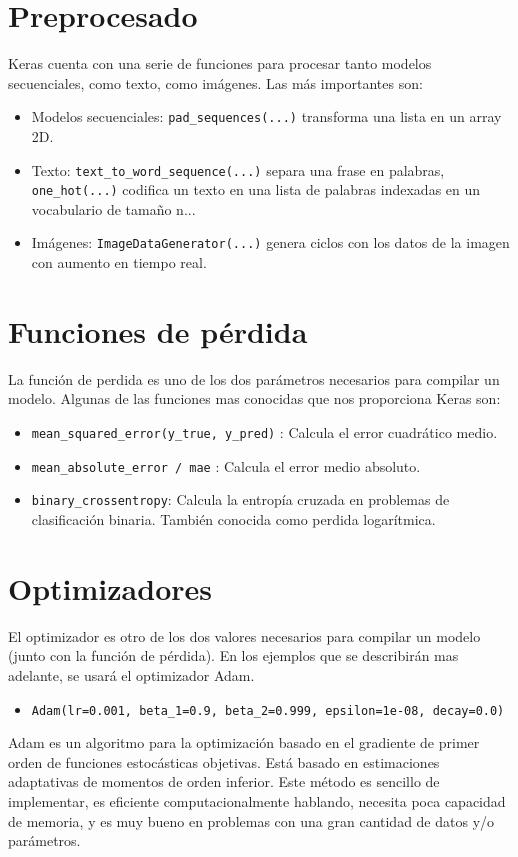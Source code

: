 \section{Preprocesado}
Keras cuenta con una serie de funciones para procesar tanto modelos secuenciales, como texto, como imágenes. Las más importantes son:
\begin{itemize}
\item Modelos secuenciales: \lstinline{pad_sequences(...)} transforma una lista en un array 2D.
\item Texto: \lstinline{text_to_word_sequence(...)} separa una frase en palabras, \lstinline{one_hot(...)} codifica un texto en una lista de palabras indexadas en un vocabulario de tamaño n...
\item Imágenes: \lstinline{ImageDataGenerator(...)} genera ciclos con los datos de la imagen con aumento en tiempo real.
\end{itemize}
\section{Funciones de pérdida}
La función de perdida es uno de los dos parámetros necesarios para compilar un modelo. Algunas de las funciones mas conocidas que nos proporciona Keras son:
\begin{itemize}[noitemsep]
\item \lstinline{mean_squared_error(y_true, y_pred)} : Calcula el error cuadrático medio.
\item \lstinline{mean_absolute_error / mae} : Calcula el error medio absoluto.
\item \lstinline{binary_crossentropy}: Calcula la entropía cruzada en problemas de clasificación binaria. También conocida como perdida logarítmica.
\end{itemize}
\section{Optimizadores}
El optimizador es otro de los dos valores necesarios para compilar un modelo (junto con la función de pérdida). En los ejemplos que se describirán mas adelante, se usará el optimizador Adam.
\begin{itemize}
\item \lstinline{Adam(lr=0.001, beta_1=0.9, beta_2=0.999, epsilon=1e-08, decay=0.0)}
\end{itemize}
Adam es un algoritmo para la optimización basado en el gradiente de primer orden de funciones estocásticas objetivas. Está basado en estimaciones adaptativas de momentos de orden inferior. Este método es sencillo de implementar, es eficiente computacionalmente hablando, necesita poca capacidad de memoria, y es muy bueno en problemas con una gran cantidad de datos y/o parámetros.
